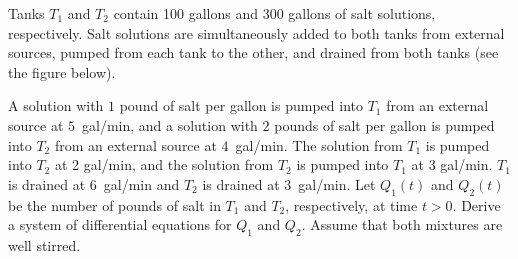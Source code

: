 \documentclass{ximera}
\begin{document}
\begin{example}\label{example:10.1.1}  
Tanks $T_1$ and $T_2$ contain 100 gallons and 300 gallons of salt
solutions, respectively. Salt solutions are simultaneously added to
both tanks from external sources, pumped from each tank to the other,
and drained from both tanks (see the figure below). 

\begin{center}
\end{center}


A solution with
$1$ pound of salt per gallon is pumped into $T_1$ from an external source
at $5$~gal/min, and a solution with $2$ pounds of salt per gallon is
pumped into $T_2$ from an external source at $4$~gal/min. The solution
from $T_1$ is pumped into $T_2$ at 2 gal/min, and the solution from
$T_2$ is pumped into $T_1$ at $3$ gal/min. $T_1$ is drained at $6$~gal/min
and $T_2$ is drained at 3~gal/min. Let $Q_1(t)$ and $Q_2(t)$ be the
number of pounds of salt in $T_1$ and $T_2$, respectively, at time
$t>0$. Derive a system of differential equations for $Q_1$ and $Q_2$.
Assume that both mixtures are well stirred.


\end{example}
\end{document}
